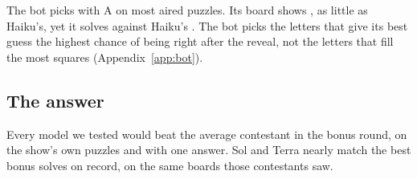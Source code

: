The bot picks \AiredBonusBotPicks{} with A on most aired puzzles. Its board shows \AiredBonusBotShown, as little as Haiku's, yet it solves \AiredBonusBot{} against Haiku's \AiredBonusHaiku. The bot picks the letters that give its best guess the highest chance of being right after the reveal, not the letters that fill the most squares (Appendix~\ref{app:bot}).

\subsection{The answer}

Every model we tested would beat the average contestant in the bonus round, on the show's own puzzles and with one answer. Sol and Terra nearly match the best bonus solves on record, on the same boards those contestants saw.
